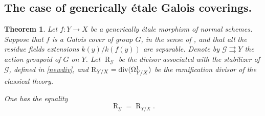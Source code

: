 \documentclass{amsart}
\newtheorem{theo}{Theorem}[section]
\theoremstyle{definition}
\theoremstyle{remark}
\begin{document}
\subsection{The case of generically \'etale Galois coverings.}

\begin{theo}

Let $f : Y {\longrightarrow} X$ be a generically \'etale morphism of normal schemes. Suppose that $f$ is a Galois cover of group $G$, in the sense of \cite{SGA1}, and that all the residue fields extensions $k(y)/k(f(y))$ are separable. Denote by ${{\mathcal G}} {\rightrightarrows} Y$ the action groupoid of $G$ on $Y$. Let $\operatorname{R}_{{\mathcal G}}$ be the divisor associated with the stabilizer of ${{\mathcal G}}$, defined in \ref{newdiv}, and $\operatorname{R}_{Y/X} = \textup{div}(\Omega^1_{Y/X})$ be the ramification divisor of the classical theory.

One has the equality \[ \operatorname{R}_{{\mathcal G}} = \operatorname{R}_{Y/X}. \]

\end{theo}
\end{document}

